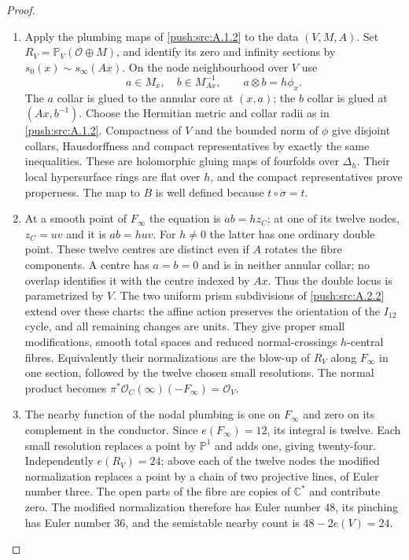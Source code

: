 \begin{proof}
\begin{enumerate}[label=\arabic*.,leftmargin=*]
\item Apply the plumbing maps of \ref{push:src:A.1.2}
to the data $(V,M,A)$.
Set $R_V=\mathbb P_V(\mathcal O\oplus M)$,
and identify its zero and infinity
sections by $s_0(x)\sim s_\infty(Ax)$.
On the node neighbourhood over $V$ use
\[
 a\in M_x,\quad b\in M_{Ax}^{-1},
 \qquad a\otimes b=h\phi_x.
\]
The $a$ collar is glued to the annular
core at $(x,a)$; the $b$ collar is glued
at $(Ax,b^{-1})$. Choose the Hermitian
metric and collar radii as in \ref{push:src:A.1.2}.
Compactness of $V$ and the bounded norm
of $\phi$ give disjoint collars,
Hausdorffness and compact representatives
by exactly the same inequalities.
These are holomorphic gluing maps of
fourfolds over $\Delta_h$.
Their local hypersurface rings are flat
over $h$, and the compact representatives
prove properness. The map to $B$ is
well defined because $t\circ\sigma=t$.

\item At a smooth point of $F_\infty$ the
equation is $ab=hz_C$; at one of its
twelve nodes, $z_C=uv$ and it is
$ab=huv$. For $h\ne0$ the latter
has one ordinary double point.
These twelve centres are distinct
even if $A$ rotates the fibre
components. A centre has $a=b=0$
and is in neither annular collar;
no overlap identifies it with the
centre indexed by $Ax$.
Thus the double locus is parametrized by $V$.
The two uniform prism subdivisions
of \ref{push:src:A.2.2} extend over these charts:
the affine action preserves the
orientation of the $I_{12}$ cycle,
and all remaining changes are units.
They give proper small modifications,
smooth total spaces and reduced
normal-crossings $h$-central fibres.
Equivalently their normalizations are
the blow-up of $R_V$ along $F_\infty$
in one section, followed by the twelve
chosen small resolutions. The normal
product becomes
$\pi^*\mathcal O_C(\infty)(-F_\infty)=\mathcal O_V$.

\item The nearby function of the nodal
plumbing is one on $F_\infty$ and
zero on its complement in the conductor.
Since $e(F_\infty)=12$, its integral
is twelve. Each small resolution
replaces a point by $\mathbb P^1$
and adds one, giving twenty-four.
Independently $e(R_V)=24$; above each
of the twelve nodes the modified
normalization replaces a point by
a chain of two projective lines,
of Euler number three. The open
parts of the fibre are copies of
$\mathbb C^*$ and contribute zero.
The modified normalization therefore
has Euler number $48$, its pinching
has Euler number $36$, and the
semistable nearby count is
$48-2e(V)=24$.


\end{enumerate}
\end{proof}
